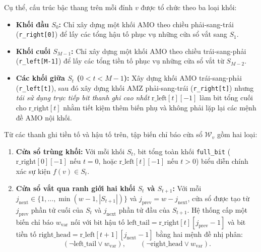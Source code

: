 \documentclass[a4paper,fleqn]{cas-sc}
\begin{document}
Cụ thể, cấu trúc bậc thang trên mỗi đỉnh $v$ được tổ chức theo ba loại khối:
\begin{itemize}
    \item \textbf{Khối đầu $S_0$:} Chỉ xây dựng một khối AMO theo chiều phải-sang-trái (\texttt{r\_right[0]}) để lấy các tổng hậu tố phục vụ những cửa sổ vắt sang $S_1$.
    \item \textbf{Khối cuối $S_{M-1}$:} Chỉ xây dựng một khối AMO theo chiều trái-sang-phải (\texttt{r\_left[M-1]}) để lấy các tổng tiền tố phục vụ những cửa sổ vắt từ $S_{M-2}$.
    \item \textbf{Các khối giữa $S_t$ ($0 < t < M - 1$):} Xây dựng khối AMO trái-sang-phải (\texttt{r\_left[t]}), sau đó xây dựng khối AMZ phải-sang-trái (\texttt{r\_right[t]}) nhưng \emph{tái sử dụng trực tiếp bit thanh ghi cao nhất} $\text{r\_left}[t][-1]$ làm bit tổng cuối cho $\text{r\_right}[t]$ nhằm tiết kiệm thêm biến phụ và không phải lặp lại các mệnh đề AMO nội khối.
\end{itemize}

Từ các thanh ghi tiền tố và hậu tố trên, tập biến chỉ báo cửa sổ $\mathcal{W}_v$ gồm hai loại:
\begin{enumerate}
    \item \textbf{Cửa sổ trùng khối:} Với mỗi khối $S_t$, bit tổng toàn khối \texttt{full\_bit} ($\text{r\_right}[0][-1]$ nếu $t = 0$, hoặc $\text{r\_left}[t][-1]$ nếu $t > 0$) biểu diễn chính xác sự kiện $f(v) \in S_t$.
    \item \textbf{Cửa sổ vắt qua ranh giới hai khối $S_t$ và $S_{t+1}$:} Với mỗi $j_{\text{next}} \in \{1, \dots, \min(w - 1, |S_{t+1}|)\}$ và $j_{\text{prev}} = w - j_{\text{next}}$, cửa sổ được tạo từ $j_{\text{prev}}$ phần tử cuối của $S_t$ và $j_{\text{next}}$ phần tử đầu của $S_{t+1}$. Hệ thống cấp một biến chỉ báo $w_{\text{var}}$ nối với bit hậu tố $\text{left\_tail} = \text{r\_right}[t][j_{\text{prev}} - 1]$ và bit tiền tố $\text{right\_head} = \text{r\_left}[t + 1][j_{\text{next}} - 1]$ bằng hai mệnh đề nhị phân:
    \begin{equation}
    (\neg \text{left\_tail} \lor w_{\text{var}}), \qquad (\neg \text{right\_head} \lor w_{\text{var}}).
    \end{equation}
\end{enumerate}
\end{document}
